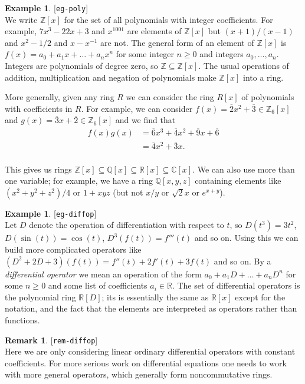 \documentclass{amsart}
\newcommand{\lbl}[1]{\label{#1}\textup{[\texttt{#1}]}\ \\}
\newcommand{\lbl}{\label}
\newcommand{\C}         {{\mathbb{C}}}
\newcommand{\Q}         {{\mathbb{Q}}}
\newcommand{\R}         {{\mathbb{R}}}
\newcommand{\Z}         {{\mathbb{Z}}}
\newcommand{\ov}[1]     {\overline{#1}}
\newcommand{\sse}       {\subseteq}
\renewcommand{\:}{\colon}
\theoremstyle{definition}
\newtheorem{remark}[theorem]{Remark}
\newtheorem{example}[theorem]{Example}
\begin{document}
\begin{example}\lbl{eg-poly}
 We write $\Z[x]$ for the set of all polynomials with integer
 coefficients.  For example, $7x^3-22x+3$ and $x^{1001}$ are elements
 of $\Z[x]$ but $(x+1)/(x-1)$ and $x^2-1/2$ and $x-x^{-1}$ are not.
 The general form of an element of $\Z[x]$ is
 $f(x)=a_0+a_1x+\ldots+a_nx^n$ for some integer $n\geq 0$ and integers
 $a_0,\ldots,a_n$.  Integers are polynomials of degree zero, so
 $\Z\sse\Z[x]$.  The usual operations of addition, multiplication and
 negation of polynomials make $\Z[x]$ into a ring.

 More generally, given any ring $R$ we can consider the ring $R[x]$ of
 polynomials with coefficients in $R$.  For example, we can consider
 $f(x)=\ov{2}x^2+\ov{3}\in\Z_6[x]$ and $g(x)=\ov{3}x+\ov{2}\in\Z_6[x]$
 and we find that 
 \begin{align*}
  f(x)g(x) &= \ov{6} x^3 + \ov{4} x^2 + \ov{9} x + \ov{6} \\
           &= \ov{4} x^2 + \ov{3} x.\\
 \end{align*}
 
 This gives us rings $\Z[x]\sse\Q[x]\sse\R[x]\sse\C[x]$.  We can also
 use more than one variable; for example, we have a ring $\Q[x,y,z]$
 containing elements like $(x^2+y^2+z^2)/4$ or $1+xyz$ (but not $x/y$
 or $\sqrt{2}x$ or $e^{x+y}$).
\end{example}
\begin{example}\lbl{eg-diffop}
 Let $D$ denote the operation of differentiation with respect to $t$,
 so $D(t^3)=3t^2$, $D(\sin(t))=\cos(t)$, $D^3(f(t))=f'''(t)$ and so
 on.  Using this we can build more complicated operators like
 $(D^2+2D+3)(f(t))=f''(t)+2f'(t)+3f(t)$ and so on.  By a
 \emph{differential operator} we mean an operation of the form
 $a_0+a_1D+\ldots+a_nD^n$ for some $n\geq 0$ and some list of
 coefficients $a_i\in\R$.  The set of differential operators is the
 polynomial ring $\R[D]$; its is essentially the same as $\R[x]$
 except for the notation, and the fact that the elements are
 interpreted as operators rather than functions.
\end{example}
\begin{remark}\lbl{rem-diffop}
 Here we are only considering linear ordinary differential operators
 with constant coefficients.  For more serious work on differential
 equations one needs to work with more general operators, which
 generally form noncommutative rings.
\end{remark}
\end{document}
